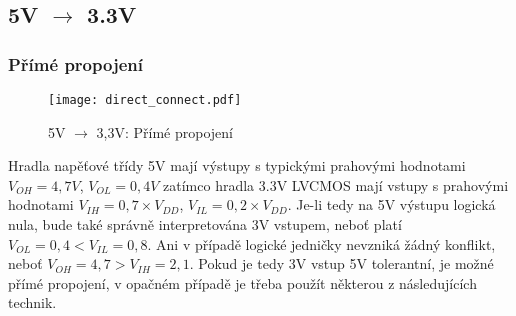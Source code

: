     \subsection{5V $\rightarrow$ 3.3V} %
      \subsubsection{Přímé propojení}
        \begin{figure}[ht!]
            \centering
            \texttt{[image: direct\_connect.pdf]}
            \caption{5V $\rightarrow$ 3,3V: Přímé propojení}
            \label{CES:fig_dir_connect}
        \end{figure}

        Hradla napěťové třídy 5V mají výstupy s typickými prahovými hodnotami $V_{OH} = 4,7 V$,
        $V_{OL} = 0,4 V$ zatímco hradla 3.3V LVCMOS mají vstupy s prahovými hodnotami $V_{IH} =
        0,7\times V_{DD} $, $V_{IL} = 0,2\times V_{DD}$. Je-li tedy na 5V výstupu logická nula,
        bude také správně interpretována 3V vstupem, neboť platí $V_{OL} = 0,4 < V_{IL} = 0,8$. Ani
        v případě logické jedničky nevzniká žádný konflikt, neboť $V_{OH} = 4,7 > V_{IH} = 2,1$.
        Pokud je tedy 3V vstup 5V tolerantní, je možné přímé propojení, v opačném případě je třeba
        použít některou z následujících technik.

